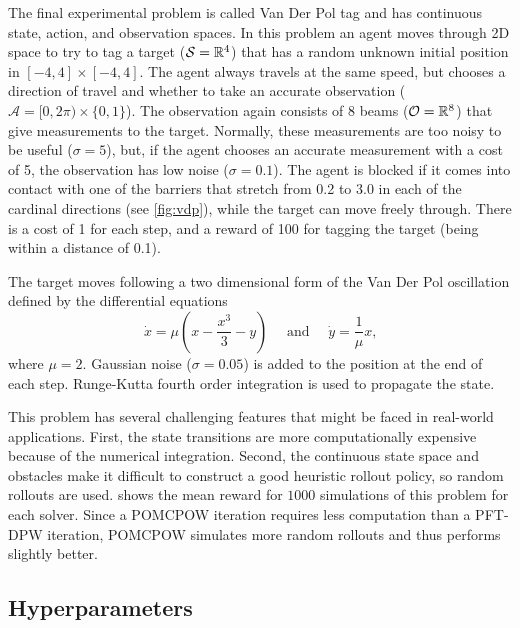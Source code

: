 The final experimental problem is called Van Der Pol tag and has continuous state, action, and observation spaces.
In this problem an agent moves through 2D space to try to tag a target ($\mathcal{S}=\mathbb{R}^4$) that has a random unknown initial position in $[-4, 4]\times[-4,4]$.
The agent always travels at the same speed, but chooses a direction of travel and whether to take an accurate observation ($\mathcal{A} = [0, 2\pi)\times\{0,1\}$).
The observation again consists of 8 beams ($\mathcal{O}=\mathbb{R}^8$) that give measurements to the target.
Normally, these measurements are too noisy to be useful ($\sigma=5$), but, if the agent chooses an accurate measurement with a cost of \num{5}, the observation has low noise ($\sigma=0.1$).
The agent is blocked if it comes into contact with one of the barriers that stretch from \num{0.2} to \num{3.0} in each of the cardinal directions (see \cref{fig:vdp}), while the target can move freely through.
There is a cost of \num{1} for each step, and a reward of \num{100} for tagging the target (being within a distance of \num{0.1}).


The target moves following a two dimensional form of the Van Der Pol oscillation defined by the differential equations%
\begin{equation}
    \dot{x} = \mu \left( x - \frac{x^3}{3} -y \right) \quad \text{ and }\quad \dot{y} = \frac{1}{\mu}x\text{,} \nonumber
\end{equation}
where $\mu=2$.
Gaussian noise ($\sigma=0.05$) is added to the position at the end of each step.
Runge-Kutta fourth order integration is used to propagate the state.

This problem has several challenging features that might be faced in real-world applications.
First, the state transitions are more computationally expensive because of the numerical integration.
Second, the continuous state space and obstacles make it difficult to construct a good heuristic rollout policy, so random rollouts are used.
 shows the mean reward for $1000$ simulations of this problem for each solver.
Since a POMCPOW iteration requires less computation than a PFT-DPW iteration, POMCPOW simulates more random rollouts and thus performs slightly better.


\subsection{Hyperparameters} \label{sec:hyper}

